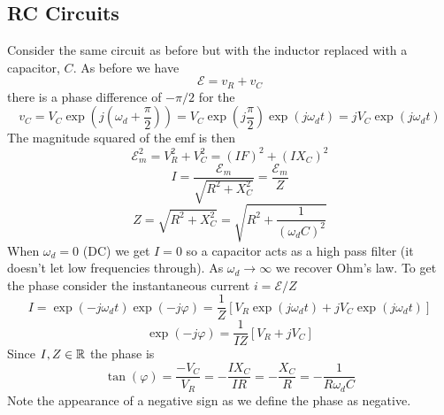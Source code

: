 \documentclass{article}
\newcommand{\emf}{\mathcal{E}}
\begin{document}
    \subsection{RC Circuits}
    Consider the same circuit as before but with the inductor replaced with a capacitor, \(C\).
    As before we have
    \[\emf = v_R + v_C\]
    there is a phase difference of \(-\pi/2\) for the 
    \[v_C = V_C\exp\left(j\left(\omega_d + \frac{\pi}{2}\right)\right) = V_C\exp\left(j\frac{\pi}{2}\right)\exp(j\omega_d t) = jV_C\exp(j\omega_d t)\]
    The magnitude squared of the emf is then
    \[\emf_m^2 = V_R^2 + V_C^2 = (IF)^2 + (IX_C)^2\]
    \[I = \frac{\emf_m}{\sqrt{R^2 + X_C^2}} = \frac{\emf_m}{Z}\]
    \[Z = \sqrt{R^2 + X_C^2} = \sqrt{R^2 + \frac{1}{(\omega_d C)^2}}\]
    When \(\omega_d = 0\) (DC) we get \(I = 0\) so a capacitor acts as a high pass filter (it doesn't let low frequencies through).
    As \(\omega_d\to\infty\) we recover Ohm's law.
    To get the phase consider the instantaneous current \(i = \emf/Z\)
    \[I = \exp(-j\omega_dt)\exp(-j\varphi) = \frac{1}{Z}[V_R\exp(j\omega_d t) + jV_C\exp(j\omega_d t)]\]
    \[\exp(-j\varphi) = \frac{1}{IZ}[V_R + jV_C]\]
    Since \(I, Z\in\mathbb{R}\) the phase is
    \[\tan(\varphi) = \frac{-V_C}{V_R} = -\frac{IX_C}{IR} = -\frac{X_C}{R} = -\frac{1}{R\omega_dC}\]
    Note the appearance of a negative sign as we define the phase as negative.
    
\end{document}
